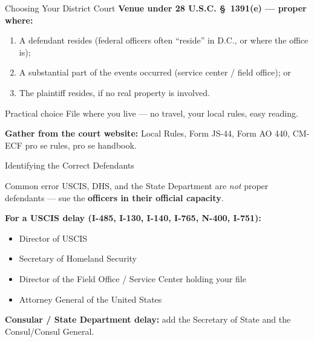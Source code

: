 \documentclass[aspectratio=169,11pt]{beamer}
\begin{document}
	\begin{frame}{Choosing Your District Court}
		\small
		\textbf{Venue under 28 U.S.C. \S~1391(e) --- proper where:}
		\begin{enumerate}
			\item A defendant resides (federal officers often ``reside'' in D.C., or where the office is);
			\item A substantial part of the events occurred (service center / field office); or
			\item The plaintiff resides, if no real property is involved.
		\end{enumerate}
		\begin{block}{Practical choice}
			\small File where you live --- no travel, your local rules, easy reading.
		\end{block}
		\textbf{Gather from the court website:} Local Rules, Form JS-44, Form AO 440, CM-ECF pro se rules, pro se handbook.
	\end{frame}
	
	\begin{frame}{Identifying the Correct Defendants}
		\small
		\begin{alertblock}{Common error}
			USCIS, DHS, and the State Department are \emph{not} proper defendants --- sue the \textbf{officers in their official capacity}.
		\end{alertblock}
		\textbf{For a USCIS delay (I-485, I-130, I-140, I-765, N-400, I-751):}
		\begin{itemize}
			\item Director of USCIS
			\item Secretary of Homeland Security
			\item Director of the Field Office / Service Center holding your file
			\item Attorney General of the United States
		\end{itemize}
		\textbf{Consular / State Department delay:} add the Secretary of State and the Consul/Consul General.
	\end{frame}
	
\end{document}
